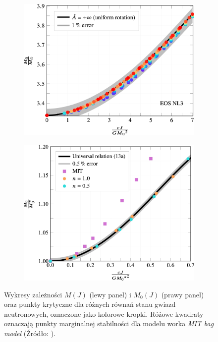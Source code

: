\documentclass{bachelor_thesis}
\begin{document}
        \begin{figure}[h!]
            \centering
            \begin{subfigure}{.5\textwidth}
              \centering
              \includegraphics[width=.98\linewidth]{figures/RysUni1.jpeg}
            \end{subfigure}%
            \begin{subfigure}{.5\textwidth}
              \centering
              \includegraphics[width=.98\linewidth]{figures/RysUni2.jpeg}
            \end{subfigure}
            \caption{Wykresy zależności $M(J)$ (lewy panel) i $M_0(J)$ (prawy panel) oraz punkty krytyczne dla różnych równań stanu gwiazd neutronowych, oznaczone jako kolorowe kropki. Różowe kwadraty oznaczają punkty marginalnej stabilności dla modelu worka \textit{MIT bag model} (Źródło: \cite{Bozzola2018}).}
            \label{RysUni}
        \end{figure}
\end{document}
